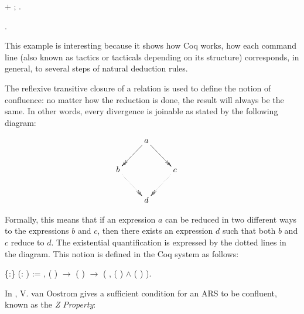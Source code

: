  \begin{coqdoccode}
\coqdocemptyline
\coqdocindent{2.00em}
+  ; . \end{coqdoccode}
 \begin{coqdoccode}
\coqdocnoindent
{}.\coqdoceol
\coqdocemptyline
\end{coqdoccode}
This example is interesting because it shows how Coq works, how
each command line (also known as tactics or tacticals depending on its
structure) corresponds, in general, to several steps of natural
deduction rules. \begin{coqdoccode}
\coqdocemptyline
\coqdocemptyline
\end{coqdoccode}
The reflexive transitive closure of a relation is used to define
    the notion of confluence: no matter how the reduction is done, the
    result will always be the same. In other words, every divergence
    is joinable as stated by the following diagram:


    $\centerline{\xymatrix{ & a \ar@{->>}[dl] \ar@{->>}[dr] & \\ b
    \ar@{.>>}[dr] & & c \ar@{.>>}[dl] \\ & d & }}$


    Formally, this means that if an expression $a$ can be reduced in
    two different ways to the expressions $b$ and $c$, then there
    exists an expression $d$ such that both $b$ and $c$ reduce to
    $d$. The existential quantification is expressed by the dotted
    lines in the diagram. This notion is defined in the Coq system as
    follows: \begin{coqdoccode}
\coqdocemptyline
\coqdocnoindent
{}  \{:\} (:  ) := \coqdockw{\ensuremath{\forall}}   , ( )   \ensuremath{\rightarrow} ( )   \ensuremath{\rightarrow} (\coqdoctac{\ensuremath{\exists}} , ( )   \ensuremath{\land} ( )  ).\coqdoceol
\coqdocemptyline
\end{coqdoccode}
In \cite{dehornoy2008z}, V. van Oostrom gives a sufficient
    condition for an ARS to be confluent, known as the \textit{Z Property}:



